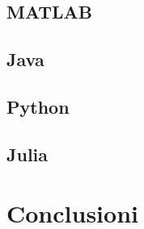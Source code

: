 \documentclass{report}
\begin{document}
            \subsection{MATLAB}
            \subsection{Java}
            \subsection{Python}
            \subsection{Julia}
        
        \section{Conclusioni}
            
                
\end{document}
